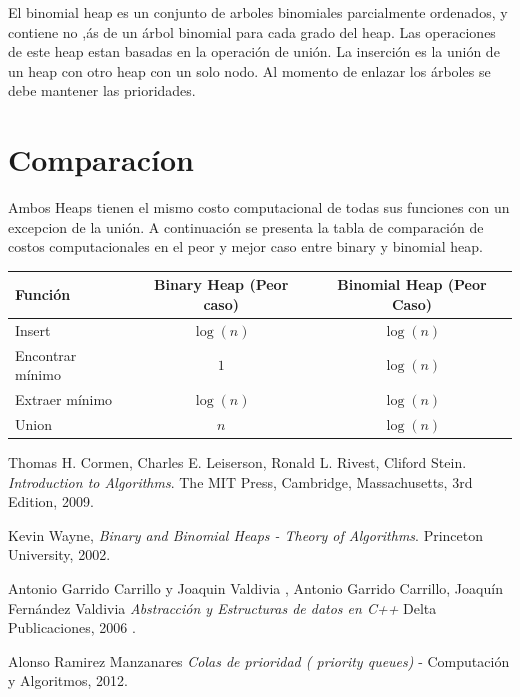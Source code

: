 \documentclass[a4paper,10pt]{article}
\begin{document}
El binomial heap es un conjunto de arboles binomiales parcialmente ordenados, y contiene no ,ás de un árbol binomial para cada grado del heap. Las operaciones de este heap estan basadas en la operación de unión. La inserción es la unión de un heap con otro heap con un solo nodo. Al momento de enlazar los árboles se debe mantener las prioridades.

\section{Comparacíon}
	Ambos Heaps tienen el mismo costo computacional de todas sus funciones con un excepcion de la unión. A continuación se presenta la tabla de comparación de costos computacionales en el peor y mejor caso entre binary y binomial heap.
\vspace{5mm}
\newline
\begin{tabular}{| l | c | c| }
 \hline                        
  Función & Binary Heap (Peor caso) & Binomial Heap (Peor Caso) \\
  \hline
  Insert & $\log(n)$ & $\log(n)$ \\
  Encontrar mínimo & $1$ & $\log(n)$ \\
  Extraer mínimo & $\log(n)$ & $\log(n)$ \\
  Union & $n$ & $\log(n)$ \\
  \hline
\end{tabular} 
	
	
	
	




\newpage
\begin{thebibliography}{9}

Thomas H. Cormen, Charles E. Leiserson, Ronald L. Rivest, Cliford Stein.
\textit{Introduction to Algorithms}. The MIT Press, Cambridge, Massachusetts, 3rd
Edition, 2009.

Kevin Wayne,\textit{ Binary and Binomial Heaps - Theory of Algorithms}. Princeton
University, 2002.

Antonio Garrido Carrillo y Joaquin Valdivia , Antonio Garrido Carrillo, Joaquín Fernández Valdivia
\textit{Abstracción y Estructuras de datos en C++}
Delta Publicaciones, 2006 .

Alonso Ramirez Manzanares \textit{Colas de prioridad ( priority queues)} - Computación y Algoritmos, 2012.


	\end{thebibliography}
	
	
	
\end{document}
